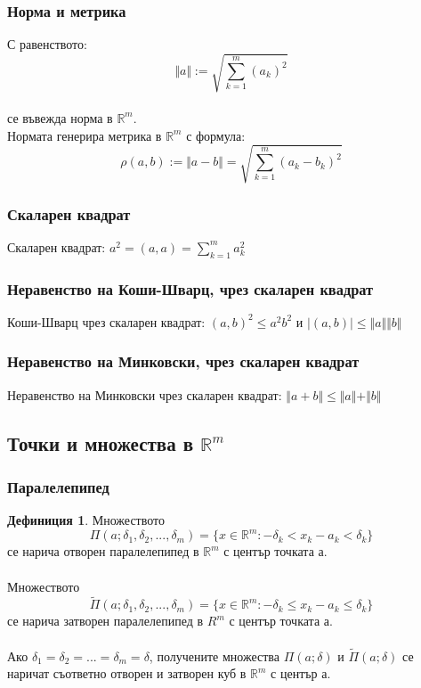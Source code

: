 \documentclass[a4paper,fleqn,12pt]{article}
\theoremstyle{definition}
\newtheorem{definition}{Дефиниция}[subsection]
\begin{document}
\subsubsection{Норма и метрика}
С равенството:
$$\Vert a\Vert := \sqrt{ \sum_{k=1}^{m}(a_k)^2  }$$ \\
се въвежда норма в $\mathbb{R}^m$.
\\
 Нормата генерира метрика в $\mathbb{R}^m$ с формула: 
$$\rho(a,b) := \Vert a-b\Vert = \sqrt{ \sum_{k=1}^{m} (a_k - b_k)^2} $$

\subsubsection{Скаларен квадрат}
Скаларен квадрат: $a^2 = (a,a) = \sum _{k=1}^{m}a_k^2$

\subsubsection{Неравенство на Коши-Шварц, чрез скаларен квадрат}
Коши-Шварц чрез скаларен квадрат: $(a,b)^2 \leq a^2b^2$ и $\vert (a,b)\vert \leq \Vert a \Vert \Vert b \Vert$

\subsubsection{Неравенство на Минковски, чрез скаларен квадрат}
Неравенство на Минковски чрез скаларен квадрат: $\Vert a+b \Vert\leq \Vert a \Vert + \Vert b \Vert$

\subsection{Точки и множества в $\mathbb{R}^m$}

\subsubsection{Паралелепипед}

\begin{definition}
Множеството\\
$$\Pi (a; \delta_1, \delta_2, ... ,\delta_m) = \{ x \in \mathbb{R}^m: -\delta_k < x_k -a_k < \delta_k   \}$$
се нарича отворен паралелепипед в $\mathbb{R}^m$ с център точката а.\\
\\
Множеството\\
$$\widetilde\Pi (a; \delta_1, \delta_2, ... ,\delta_m) = \{ x \in\mathbb{R}^m: -\delta_k \leq x_k -a_k \leq \delta_k   \}$$
се нарича затворен паралелепипед в $R^m$ с център точката а.\\
\\
Ако $\delta_1 = \delta_2 = ... = \delta_m = \delta$, получените множества $\Pi (a; \delta)$ и $\widetilde\Pi (a; \delta)$ се  наричат съответно отворен и затворен куб в $\mathbb{R}^m$ с център а.
 \end{definition}
\end{document}
